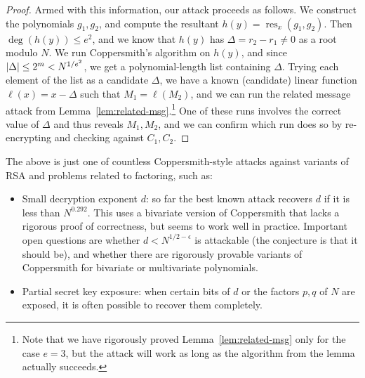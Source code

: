 \documentclass[11pt]{article}
\DeclareMathOperator{\res}{res}
\begin{document}
\begin{proof}
  Armed with this information, our attack proceeds as follows. We
  construct the polynomials $g_1, g_2$, and compute the resultant
  $h(y)=\res_x(g_1,g_2)$. Then $\deg(h(y)) \leq e^2$, and we know that
  $h(y)$ has $\Delta=r_2-r_1 \neq 0$ as a root modulo $N$. We run
  Coppersmith's algorithm on $h(y)$, and since
  $\lvert\Delta\rvert \leq 2^{m} < N^{1/e^2}$, we get a polynomial-length
  list containing $\Delta$.  Trying each element of the list as a
  candidate $\Delta$, we have a known (candidate) linear function
  $\ell(x)=x - \Delta$ such that $M_{1} = \ell(M_{2})$, and we can run
  the related message attack from
  Lemma~\ref{lem:related-msg}.\footnote{Note that we have rigorously
    proved Lemma~\ref{lem:related-msg} only for the case $e=3$, but
    the attack will work as long as the algorithm from the lemma
    actually succeeds.}  One of these runs involves the correct value
  of $\Delta$ and thus reveals $M_{1}, M_{2}$, and we can confirm
  which run does so by re-encrypting and checking against
  $C_{1}, C_{2}$.
\end{proof}

The above is just one of countless Coppersmith-style attacks against
variants of RSA and problems related to factoring, such as:
\begin{itemize}[itemsep=0pt]
\item Small decryption exponent $d$: so far the best known attack
  recovers $d$ if it is less than $N^{0.292}$. This uses a bivariate
  version of Coppersmith that lacks a rigorous proof of correctness,
  but seems to work well in practice.  Important open questions are
  whether $d < N^{1/2-\epsilon}$ is attackable (the conjecture is that
  it should be), and whether there are rigorously provable variants of
  Coppersmith for bivariate or multivariate polynomials.
\item Partial secret key exposure: when certain bits of $d$ or the
  factors $p,q$ of $N$ are exposed, it is often possible to recover
  them completely.
\end{itemize}
\end{document}
